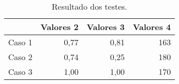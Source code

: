 \begin{table}[!htb]
    \centering
    \caption[Resultado dos testes]{Resultado dos testes.\label{tab:tabela-exemplo1}}
    \begin{tabularx}{\textwidth}{rrrr}
        \toprule
            & Valores 2 & Valores 3 & Valores 4 \\
        \midrule
            Caso 1 & 0,77 & 0,81 & 163 \\
            Caso 2 & 0,74 & 0,25 & 180 \\
            Caso 3 & 1,00 & 1,00 & 170 \\
        \bottomrule
    \end{tabularx}
\end{table}